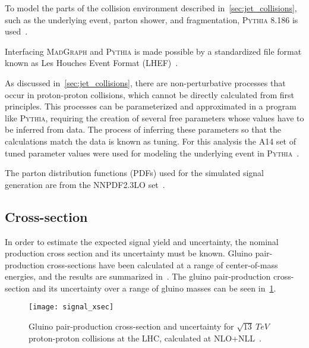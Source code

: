 To model the parts of the collision environment described in~\ref{sec:jet_collisions}, such as the underlying event,
parton shower, and fragmentation, \textsc{Pythia} 8.186 is used~\cite{signal-pythia}.

Interfacing \textsc{MadGraph} and \textsc{Pythia} is made possible by a standardized file format known as Les Houches
Event Format (LHEF)~\cite{signal-lhef}.

As discussed in~\ref{sec:jet_collisions}, there are non-perturbative processes that occur in proton-proton collisions,
which cannot be directly calculated from first principles.
This processes can be parameterized and approximated in a program like \textsc{Pythia},
requiring the creation of several free parameters whose values have to be inferred from data.
The process of inferring these parameters so that the calculations match the data is known as tuning.
For this analysis the A14 set of tuned parameter values were used for modeling the underlying event in
\textsc{Pythia}~\cite{signal-pythia-a14,signal-pythia-tunes}.

The parton distribution functions (PDFs) used for the simulated signal generation are from the NNPDF2.3LO
set~\cite{signal-nnpdf}.

\subsection{Cross-section}\label{subsec:signal_cross_section}
In order to estimate the expected signal yield and uncertainty, the nominal production cross section and its uncertainty
must be known.
Gluino pair-production cross-sections have been calculated at a range of center-of-mass energies, and the results
are summarized in~\cite{signal-xsec}.
The gluino pair-production cross-section and its uncertainty over a range of gluino masses can be seen in~\ref{fig:signal_xsec}.

\begin{figure}[!ht]
    \centering
\texttt{[image: signal\_xsec]}
\caption{Gluino pair-production cross-section and uncertainty for $\sqrt{13}~TeV$ proton-proton collisions at the LHC,
calculated at NLO+NLL~\cite{signal-xsec}.}
\label{fig:signal_xsec}
\end{figure}
